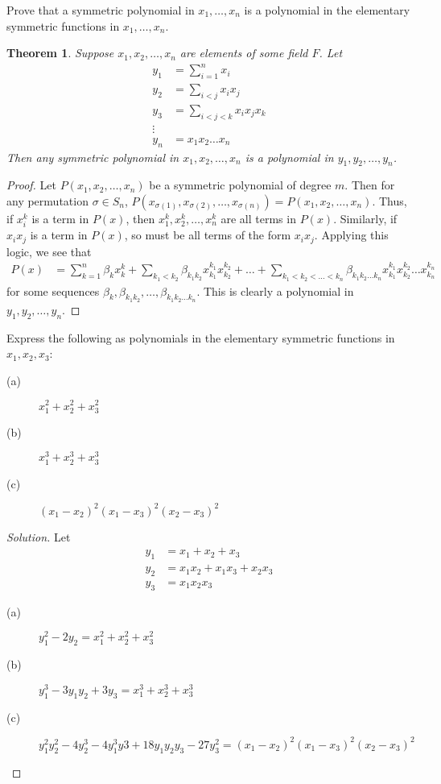 \documentclass[12pt,leqno]{article}
\numberwithin{equation}{section}
\newcommand{\question}[2] {\vspace{.25in} \fbox{#1} #2 \vspace{.10in}}
\newtheorem*{Thm}{Theorem}
\theoremstyle{definition}
\begin{document}
\question{7}{Prove that a symmetric polynomial in $x_1,\hdots,x_n$ is a polynomial in the elementary symmetric functions in $x_1,\hdots,x_n$.}

\begin{Thm}
 Suppose $x_1,x_2,\hdots,x_n$ are elements of some field $F$. Let \begin{align*}y_1&=\sum_{i=1}^nx_i\\y_2&=\sum_{i<j}x_ix_j\\y_3&=\sum_{i<j<k}x_ix_jx_k\\\vdots\\y_n&=x_1x_2\hdots x_n\end{align*} Then any symmetric polynomial in $x_1,x_2,\hdots,x_n$ is a polynomial in $y_1,y_2,\hdots,y_n$.
\end{Thm}

\begin{proof}
Let $P(x_1,x_2,\hdots,x_n)$ be a symmetric polynomial of degree $m$. Then for any permutation $\sigma\in S_n$, $P(x_{\sigma(1)},x_{\sigma(2)},\hdots,x_{\sigma(n)})=P(x_1,x_2,\hdots,x_n)$. Thus, if $x_i^k$ is a term in $P(x)$, then $x_1^k,x_2^k,\hdots,x_n^k$ are all terms in $P(x)$. Similarly, if $x_ix_j$ is a term in $P(x)$, so must be all terms of the form $x_ix_j$. Applying this logic, we see that \begin{align*}P(x)&=\sum_{k=1}^n\beta_kx_k^k+\sum_{k_1<k_2}\beta_{k_1k_2}x_{k_1}^{k_1}x_{k_2}^{k_2}+\hdots+\sum_{k_1<k_2<\hdots<k_n}\beta_{k_1k_2\hdots k_n}x_{k_1}^{k_1}x_{k_2}^{k_2}\hdots x_{k_n}^{k_n}\end{align*} for some sequences $\beta_k,\beta_{k_1k_2},\hdots,\beta_{k_1k_2\hdots k_n}$. This is clearly a polynomial in $y_1,y_2,\hdots,y_n$.
\end{proof}


\question{8}{Express the following as polynomials in the elementary symmetric functions in $x_1,x_2,x_3$:}
\begin{description}
\item [(a)] $x_1^2+x_2^2+x_3^2$
\item [(b)] $x_1^3+x_2^3+x_3^3$
\item [(c)] $(x_1-x_2)^2(x_1-x_3)^2(x_2-x_3)^2$
\end{description}

\begin{proof}[Solution]
Let \begin{align*}y_1&=x_1+x_2+x_3\\y_2&=x_1x_2+x_1x_3+x_2x_3\\y_3&=x_1x_2x_3\end{align*}
 \begin{description}
  \item [(a)] $y_1^2-2y_2=x_1^2+x_2^2+x_3^2$
  \item [(b)] $y_1^3-3y_1y_2+3y_3=x_1^3+x_2^3+x_3^3$
  \item [(c)] $y_1^2y_2^2-4y_2^3-4y_1^3y3+18y_1y_2y_3-27y_3^2=(x_1-x_2)^2(x_1-x_3)^2(x_2-x_3)^2$
 \end{description}

\end{proof}
\end{document}
